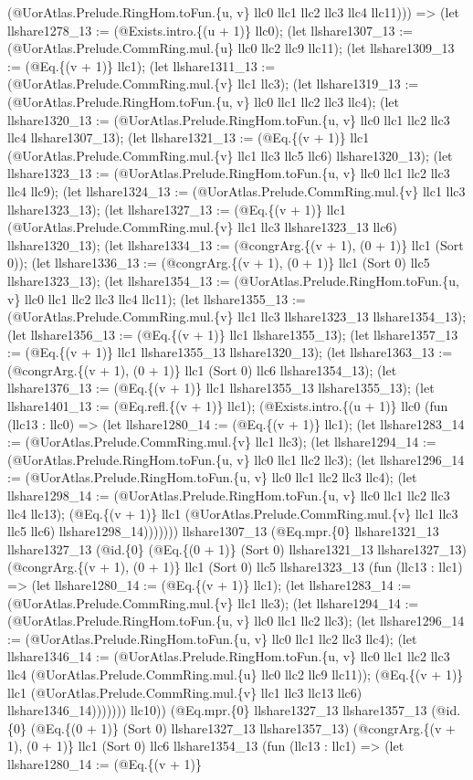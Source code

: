 \documentclass[11pt]{article}
\begin{document}
(@UorAtlas.Prelude.RingHom.toFun.\{u, v\} llc0 llc1 llc2 llc3 llc4 llc11))) => (let llshare1278\_13 := (@Exists.intro.\{(u + 1)\} llc0); (let llshare1307\_13 := (@UorAtlas.Prelude.CommRing.mul.\{u\} llc0 llc2 llc9 llc11); (let llshare1309\_13 := (@Eq.\{(v + 1)\} llc1); (let llshare1311\_13 := (@UorAtlas.Prelude.CommRing.mul.\{v\} llc1 llc3); (let llshare1319\_13 := (@UorAtlas.Prelude.RingHom.toFun.\{u, v\} llc0 llc1 llc2 llc3 llc4); (let llshare1320\_13 := (@UorAtlas.Prelude.RingHom.toFun.\{u, v\} llc0 llc1 llc2 llc3 llc4 llshare1307\_13); (let llshare1321\_13 := (@Eq.\{(v + 1)\} llc1 (@UorAtlas.Prelude.CommRing.mul.\{v\} llc1 llc3 llc5 llc6) llshare1320\_13); (let llshare1323\_13 := (@UorAtlas.Prelude.RingHom.toFun.\{u, v\} llc0 llc1 llc2 llc3 llc4 llc9); (let llshare1324\_13 := (@UorAtlas.Prelude.CommRing.mul.\{v\} llc1 llc3 llshare1323\_13); (let llshare1327\_13 := (@Eq.\{(v + 1)\} llc1 (@UorAtlas.Prelude.CommRing.mul.\{v\} llc1 llc3 llshare1323\_13 llc6) llshare1320\_13); (let llshare1334\_13 := (@congrArg.\{(v + 1), (0 + 1)\} llc1 (Sort 0)); (let llshare1336\_13 := (@congrArg.\{(v + 1), (0 + 1)\} llc1 (Sort 0) llc5 llshare1323\_13); (let llshare1354\_13 := (@UorAtlas.Prelude.RingHom.toFun.\{u, v\} llc0 llc1 llc2 llc3 llc4 llc11); (let llshare1355\_13 := (@UorAtlas.Prelude.CommRing.mul.\{v\} llc1 llc3 llshare1323\_13 llshare1354\_13); (let llshare1356\_13 := (@Eq.\{(v + 1)\} llc1 llshare1355\_13); (let llshare1357\_13 := (@Eq.\{(v + 1)\} llc1 llshare1355\_13 llshare1320\_13); (let llshare1363\_13 := (@congrArg.\{(v + 1), (0 + 1)\} llc1 (Sort 0) llc6 llshare1354\_13); (let llshare1376\_13 := (@Eq.\{(v + 1)\} llc1 llshare1355\_13 llshare1355\_13); (let llshare1401\_13 := (@Eq.refl.\{(v + 1)\} llc1); (@Exists.intro.\{(u + 1)\} llc0 (fun (llc13 : llc0) => (let llshare1280\_14 := (@Eq.\{(v + 1)\} llc1); (let llshare1283\_14 := (@UorAtlas.Prelude.CommRing.mul.\{v\} llc1 llc3); (let llshare1294\_14 := (@UorAtlas.Prelude.RingHom.toFun.\{u, v\} llc0 llc1 llc2 llc3); (let llshare1296\_14 := (@UorAtlas.Prelude.RingHom.toFun.\{u, v\} llc0 llc1 llc2 llc3 llc4); (let llshare1298\_14 := (@UorAtlas.Prelude.RingHom.toFun.\{u, v\} llc0 llc1 llc2 llc3 llc4 llc13); (@Eq.\{(v + 1)\} llc1 (@UorAtlas.Prelude.CommRing.mul.\{v\} llc1 llc3 llc5 llc6) llshare1298\_14))))))) llshare1307\_13 (@Eq.mpr.\{0\} llshare1321\_13 llshare1327\_13 (@id.\{0\} (@Eq.\{(0 + 1)\} (Sort 0) llshare1321\_13 llshare1327\_13) (@congrArg.\{(v + 1), (0 + 1)\} llc1 (Sort 0) llc5 llshare1323\_13 (fun (llc13 : llc1) => (let llshare1280\_14 := (@Eq.\{(v + 1)\} llc1); (let llshare1283\_14 := (@UorAtlas.Prelude.CommRing.mul.\{v\} llc1 llc3); (let llshare1294\_14 := (@UorAtlas.Prelude.RingHom.toFun.\{u, v\} llc0 llc1 llc2 llc3); (let llshare1296\_14 := (@UorAtlas.Prelude.RingHom.toFun.\{u, v\} llc0 llc1 llc2 llc3 llc4); (let llshare1346\_14 := (@UorAtlas.Prelude.RingHom.toFun.\{u, v\} llc0 llc1 llc2 llc3 llc4 (@UorAtlas.Prelude.CommRing.mul.\{u\} llc0 llc2 llc9 llc11)); (@Eq.\{(v + 1)\} llc1 (@UorAtlas.Prelude.CommRing.mul.\{v\} llc1 llc3 llc13 llc6) llshare1346\_14))))))) llc10)) (@Eq.mpr.\{0\} llshare1327\_13 llshare1357\_13 (@id.\{0\} (@Eq.\{(0 + 1)\} (Sort 0) llshare1327\_13 llshare1357\_13) (@congrArg.\{(v + 1), (0 + 1)\} llc1 (Sort 0) llc6 llshare1354\_13 (fun (llc13 : llc1) => (let llshare1280\_14 := (@Eq.\{(v + 1)\} 
\end{document}

